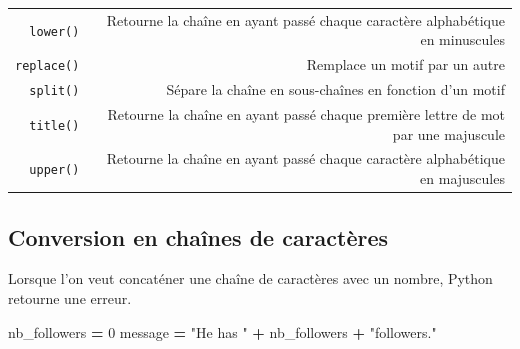 \documentclass[12pt,]{book}
\newenvironment{Shaded}{\begin{snugshade}}{\end{snugshade}}
\newcommand{\DecValTok}[1]{\textcolor[rgb]{0.00,0.00,0.81}{#1}}
\newcommand{\StringTok}[1]{\textcolor[rgb]{0.31,0.60,0.02}{#1}}
\newcommand{\OperatorTok}[1]{\textcolor[rgb]{0.81,0.36,0.00}{\textbf{#1}}}
\newcommand{\NormalTok}[1]{#1}
\numberwithin{equation}{section}
\numberwithin{countremarque}{section}
\begin{document}
\begin{longtable}[]{@{}rr@{}}
\begin{minipage}[t]{0.15\columnwidth}
\texttt{lower()}\strut
\end{minipage} & \begin{minipage}[t]{0.79\columnwidth}\raggedleft\strut
Retourne la chaîne en ayant passé chaque caractère alphabétique en
minuscules\strut
\end{minipage}\tabularnewline
\begin{minipage}[t]{0.15\columnwidth}\raggedleft\strut
\texttt{replace()}\strut
\end{minipage} & \begin{minipage}[t]{0.79\columnwidth}\raggedleft\strut
Remplace un motif par un autre\strut
\end{minipage}\tabularnewline
\begin{minipage}[t]{0.15\columnwidth}\raggedleft\strut
\texttt{split()}\strut
\end{minipage} & \begin{minipage}[t]{0.79\columnwidth}\raggedleft\strut
Sépare la chaîne en sous-chaînes en fonction d'un motif\strut
\end{minipage}\tabularnewline
\begin{minipage}[t]{0.15\columnwidth}\raggedleft\strut
\texttt{title()}\strut
\end{minipage} & \begin{minipage}[t]{0.79\columnwidth}\raggedleft\strut
Retourne la chaîne en ayant passé chaque première lettre de mot par une
majuscule\strut
\end{minipage}\tabularnewline
\begin{minipage}[t]{0.15\columnwidth}\raggedleft\strut
\texttt{upper()}\strut
\end{minipage} & \begin{minipage}[t]{0.79\columnwidth}\raggedleft\strut
Retourne la chaîne en ayant passé chaque caractère alphabétique en
majuscules\strut
\end{minipage}\tabularnewline
\bottomrule
\end{longtable}

\subsection{Conversion en chaînes de
caractères}\label{conversion-en-chaines-de-caracteres}

Lorsque l'on veut concaténer une chaîne de caractères avec un nombre,
Python retourne une erreur.

\begin{Shaded}
\begin{Highlighting}[]
\NormalTok{nb_followers }\OperatorTok{=} \DecValTok{0}
\NormalTok{message }\OperatorTok{=} \StringTok{"He has "} \OperatorTok{+}\NormalTok{ nb_followers }\OperatorTok{+} \StringTok{"followers."}
\end{Highlighting}
\end{Shaded}
\end{document}
